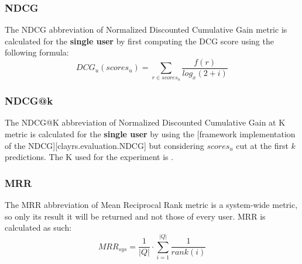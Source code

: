 
\subsubsection{NDCG}\label{subsubsec:ndcg}
The NDCG abbreviation of Normalized Discounted Cumulative Gain metric is calculated for the \textbf{single user}
by first computing the DCG score using the following formula:
\hfill\break
\hfill\break
    \[
        DCG_{u}(scores_{u}) = \sum_{r\in scores_{u}}{\frac{f(r)}{log_x(2 + i)}}
    \]
\hfill\break

\subsubsection{NDCG@k}\label{subsubsec:ndcg-k}
The NDCG@K abbreviation of Normalized Discounted Cumulative Gain at K metric is calculated for the \textbf{single user}
by using the [framework implementation of the NDCG][clayrs.evaluation.NDCG] but considering $scores_{u}$ cut at the
first $k$ predictions.
The K used for the experiment is .
\hfill\break


\subsubsection{MRR}\label{subsubsec:mrr}
The MRR abbreviation of Mean Reciprocal Rank metric is a system-wide metric, so only its result it will be returned
and not those of every user.
MRR is calculated as such:
\hfill\break
\hfill\break
    \[
        MRR_{sys} = \frac{1}{|Q|}\cdot\sum_{i=1}^{|Q|}\frac{1}{rank(i)}
    \]
\hfill\break


